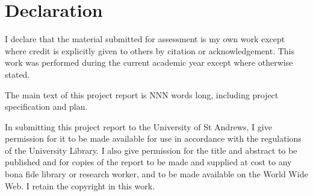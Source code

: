 


\chapter*{Declaration}

I declare that the material submitted for assessment is my own work except
where credit is explicitly given to others by citation or acknowledgement. This
work was performed during the current academic year except where otherwise
stated.

The main text of this project report is NNN words long, including project
specification and plan.

In submitting this project report to the University of St Andrews, I give
permission for it to be made available for use in accordance with the
regulations of the University Library. I also give permission for the title and
abstract to be published and for copies of the report to be made and supplied
at cost to any bona fide library or research worker, and to be made available
on the World Wide Web. I retain the copyright in this work.


